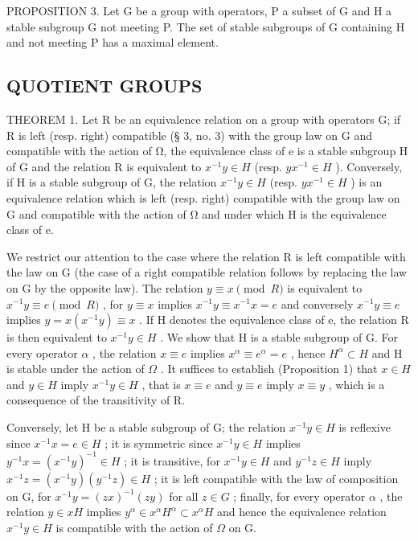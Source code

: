 PROPOSITION 3. Let G be a group with operators, P a subset of G and H a stable subgroup G not meeting P. The set of stable subgroups of G containing H and not meeting P has a maximal element.

\subsection{QUOTIENT GROUPS}

THEOREM 1. Let R be an equivalence relation on a group with operators G; if R is left (resp. right) compatible (§ 3, no. 3) with the group law on G and compatible with the action of Ω, the equivalence class of e is a stable subgroup H of G and the relation R is equivalent to \(x^{-1}y \in H\) (resp. \(yx^{-1} \in H\) ). Conversely, if H is a stable subgroup of G, the relation \(x^{-1}y \in H\) (resp. \(yx^{-1} \in H\) ) is an equivalence relation which is left (resp. right) compatible with the group law on G and compatible with the action of Ω and under which H is the equivalence class of e.

We restrict our attention to the case where the relation R is left compatible with the law on G (the case of a right compatible relation follows by replacing the law on G by the opposite law). The relation \(y \equiv x \pmod{R}\) is equivalent to \(x^{-1}y \equiv e \pmod{R}\) , for \(y \equiv x\) implies \(x^{-1}y \equiv x^{-1}x = e\) and conversely \(x^{-1}y \equiv e\) implies \(y = x(x^{-1}y) \equiv x\) . If H denotes the equivalence class of e, the relation R is then equivalent to \(x^{-1}y \in H\) . We show that H is a stable subgroup of G. For every operator \(\alpha\) , the relation \(x \equiv e\) implies \(x^{\alpha} \equiv e^{\alpha} = e\) , hence \(H^{\alpha} \subset H\) and H is stable under the action of \(\Omega\) . It suffices to establish (Proposition 1) that \(x \in H\) and \(y \in H\) imply \(x^{-1}y \in H\) , that is \(x \equiv e\) and \(y \equiv e\) imply \(x \equiv y\) , which is a consequence of the transitivity of R.

Conversely, let H be a stable subgroup of G; the relation \(x^{-1}y \in H\) is reflexive since \(x^{-1}x = e \in H\) ; it is symmetric since \(x^{-1}y \in H\) implies \(y^{-1}x = (x^{-1}y)^{-1} \in H\) ; it is transitive, for \(x^{-1}y \in H\) and \(y^{-1}z \in H\) imply \(x^{-1}z = (x^{-1}y)(y^{-1}z) \in H\) ; it is left compatible with the law of composition on G, for \(x^{-1}y = (zx)^{-1}(zy)\) for all \(z \in G\) ; finally, for every operator \(\alpha\) , the relation \(y \in xH\) implies \(y^{\alpha} \in x^{\alpha}H^{\alpha} \subset x^{\alpha}H\) and hence the equivalence relation \(x^{-1}y \in H\) is compatible with the action of \(\Omega\) on G.

